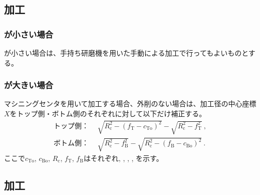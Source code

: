 \subsection{\EndFaceOutChamfer 加工}

\subsubsection{\EndFaceChamferLength が小さい場合}
\EndFaceOutChamferLength が小さい場合は、手持ち研磨機を用いた手動による加工で行ってもよいものとする。

\subsubsection{\EndFaceChamferLength が大きい場合}
マシニングセンタを用いて加工する場合、外削のない場合は、加工径の中心座標$X$をトップ側・ボトム側のそれぞれに対して以下だけ補正する。
\begin{align*}
  \text{トップ側：}&~~
  \sqrt{R_\mathrm c^2-\left(f_\mathrm T-c_\mathrm{To}\right)^2}-\sqrt{R_\mathrm c^2-f_\mathrm T^2}\ ,\\
  \text{ボトム側：}&~~
  \sqrt{R_\mathrm c^2-f_\mathrm B^2}-\sqrt{R_\mathrm c^2-\left(f_\mathrm B-c_\mathrm{Bo}\right)^2}\ .
\end{align*}
ここで$c_\mathrm{To}$, $c_\mathrm{Bo}$, $R_\mathrm c$, $f_\mathrm T$, $f_\mathrm B$はそれぞれ\TopEndFaceOutChamferLength, \BottomEndFaceOutChamferLength, \CenterCurvatureRadius, \TopAlocationLength, \BottomAlocationLength を示す。


\clearpage
\subsection{\EndFaceInChamfer 加工}

